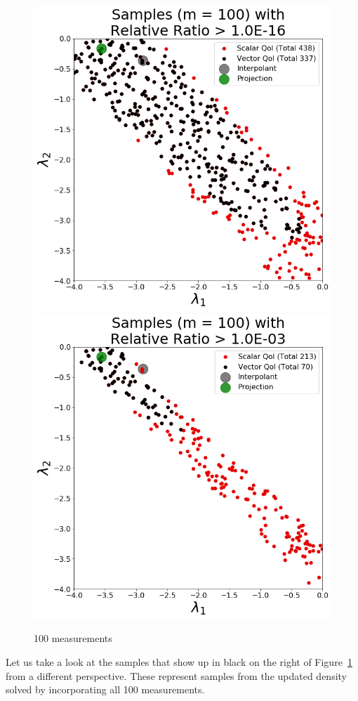 \begin{figure}[htbp]
\centering
  \includegraphics[width=0.45\linewidth]{figures/pde-highd/pde-highd_update_scatter_D2_t1-0E-16.png}
  \includegraphics[width=0.45\linewidth]{figures/pde-highd/pde-highd_update_scatter_D2_t1-0E-03.png}
\caption{
100 measurements
}
\label{fig:pde-highd-2d-scatter}
\end{figure}


Let us take a look at the samples that show up in black on the right of Figure~\ref{fig:pde-highd-2d-scatter} from a different perspective.
These represent samples from the updated density solved by incorporating all 100 measurements.

